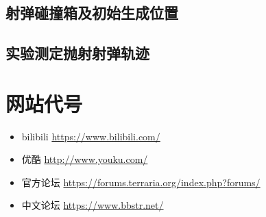 \section{射弹碰撞箱及初始生成位置}

\section{实验测定抛射射弹轨迹}

\chapter{网站代号}
\begin{itemize}
\item bilibili \url{https://www.bilibili.com/}
\item 优酷 \url{http://www.youku.com/}
\item 官方论坛 \url{https://forums.terraria.org/index.php?forums/}
\item 中文论坛 \url{https://www.bbstr.net/}
\end{itemize}


